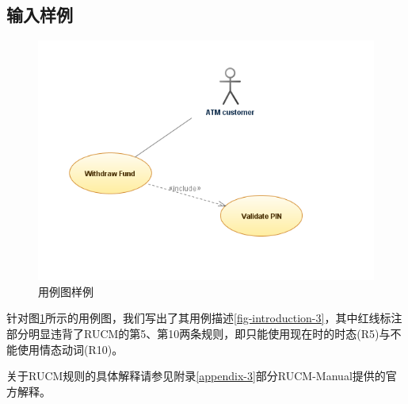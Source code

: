 \subsection{输入样例}
\begin{figure}[htbp]
    \begin{center}
        \includegraphics[scale=1.2]{src/introduction-2.png}
        \caption{用例图样例}
        \label{fig-introduction-2}
    \end{center}
\end{figure}


针对图\ref{fig-introduction-2}所示的用例图，我们写出了其用例描述\ref{fig-introduction-3}，其中红线标注部分明显违背了RUCM的第5、第10两条规则，即只能使用现在时的时态(R5)与不能使用情态动词(R10)。

关于RUCM规则的具体解释请参见附录\ref{appendix-3}部分RUCM-Manual提供的官方解释。

